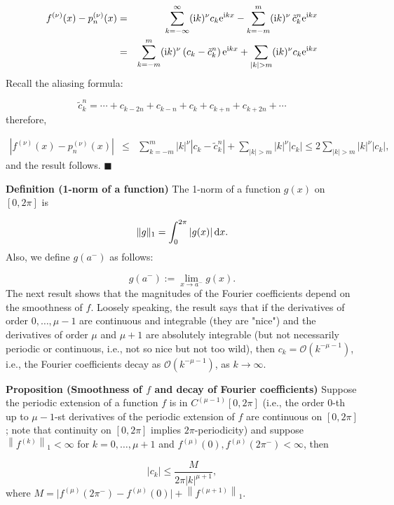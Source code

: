 \documentclass[12pt,landscape]{article}
\begin{document}
{\begin{eqnarray*}
f^{(\nu)}(x) - p^{(\nu)}_n(x) & = & \sum_{k=-\infty}^{\infty}({\rm i}k)^{\nu}c_k{\rm e}^{{\rm i}kx} - \sum_{k=-m}^{m}({\rm i}k)^{\nu}\,\tilde{c}^n_k{\rm e}^{{\rm i}kx} \\
 &=& \sum_{k=-m}^{m}({\rm i}k)^{\nu}\left(c_k - \tilde{c}^n_k\right){\rm e}^{{\rm i}kx} + \sum_{\vert k \vert > m} ({\rm i}k)^{\nu}c_k{\rm e}^{{\rm i}kx}
\end{eqnarray*}
Recall the aliasing formula:

\[
\tilde{c}^n_k = \cdots + c_{k-2n} + c_{k-n} +  c_k +  c_{k+n} + c_{k+2n} + \cdots
\]
therefore,


\begin{eqnarray}
\left\vert f^{(\nu)}(x) - p^{(\nu)}_n(x) \right\vert & \leq &  \sum_{k=-m}^{m} \vert k\vert^{\nu}\left\vert c_k - \tilde{c}^n_k\right\vert + \sum_{\vert k \vert > m} \vert k \vert^{\nu} \vert c_k \vert \leq  2\sum_{\vert k \vert > m} \vert k \vert^{\nu} \vert c_k \vert,
\end{eqnarray}
and the result follows.  $\blacksquare$

\textbf{Definition (1-norm of a function)} The 1-norm of a function $g(x)$ on $[0, 2\pi]$ is

\[
\| g \|_1 = \int_{0}^{2\pi}  \vert g(x) \vert \, {\rm d}x. 
\]
Also, we define $g(a^{-})$ as follows:

\[
g(a^{-}) :=\lim_{x\to a^{-}} g(x).
\]
The next result shows that the magnitudes of the Fourier coefficients depend on the smoothness of $f$. Loosely speaking, the result says that if the derivatives of order $0, \ldots, \mu-1$ are continuous and integrable (they are "nice") and the derivatives of order $\mu$ and $\mu+1$ are absolutely integrable (but not necessarily periodic or continuous, i.e., not so nice but not too wild), then $c_k = \mathcal{O}(k^{-\mu-1})$, i.e., the Fourier coefficients decay as $\mathcal{O}(k^{-\mu-1})$, as $k \to \infty$.

\textbf{Proposition (Smoothness of $f$ and decay of Fourier coefficients)} Suppose the periodic extension of a function $f$ is in $C^{(\mu-1)}[0, 2\pi]$ (i.e., the order $0$-th up to $\mu-1$-st derivatives of the periodic extension of $f$ are continuous on $[0, 2\pi]$; note that continuity on $[0, 2\pi]$ implies $2\pi$-periodicity) and suppose $\left\| f^{(k)} \right\|_{1} < \infty$ for $k = 0, \ldots, \mu+1$ and $f^{(\mu)}(0), f^{(\mu)}(2\pi^{-}) < \infty$, then

\[
\left\vert c_k   \right\vert \leq  \frac{M}{2\pi \vert k \vert^{\mu+1}},
\]
where $M =  \vert f^{(\mu)}(2\pi^{-}) - f^{(\mu)}(0)   \vert + \left\|f^{(\mu+1)}   \right\|_1$.

}
\end{document}
